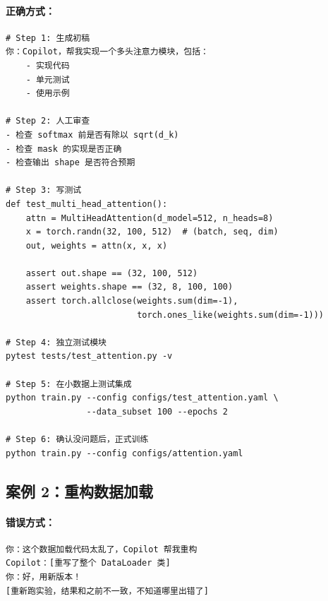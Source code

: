 \paragraph{正确方式：}
\begin{verbatim}
# Step 1: 生成初稿
你：Copilot，帮我实现一个多头注意力模块，包括：
    - 实现代码
    - 单元测试
    - 使用示例

# Step 2: 人工审查
- 检查 softmax 前是否有除以 sqrt(d_k)
- 检查 mask 的实现是否正确
- 检查输出 shape 是否符合预期

# Step 3: 写测试
def test_multi_head_attention():
    attn = MultiHeadAttention(d_model=512, n_heads=8)
    x = torch.randn(32, 100, 512)  # (batch, seq, dim)
    out, weights = attn(x, x, x)

    assert out.shape == (32, 100, 512)
    assert weights.shape == (32, 8, 100, 100)
    assert torch.allclose(weights.sum(dim=-1),
                          torch.ones_like(weights.sum(dim=-1)))

# Step 4: 独立测试模块
pytest tests/test_attention.py -v

# Step 5: 在小数据上测试集成
python train.py --config configs/test_attention.yaml \
                --data_subset 100 --epochs 2

# Step 6: 确认没问题后，正式训练
python train.py --config configs/attention.yaml
\end{verbatim}

\subsection{案例 2：重构数据加载}

\paragraph{错误方式：}
\begin{verbatim}
你：这个数据加载代码太乱了，Copilot 帮我重构
Copilot：[重写了整个 DataLoader 类]
你：好，用新版本！
[重新跑实验，结果和之前不一致，不知道哪里出错了]
\end{verbatim}

